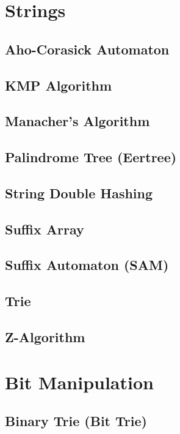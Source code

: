 \section{Strings}
\subsection{Aho-Corasick Automaton}

\subsection{KMP Algorithm}

\subsection{Manacher's Algorithm}

\subsection{Palindrome Tree (Eertree)}

\subsection{String Double Hashing}

\subsection{Suffix Array}

\subsection{Suffix Automaton (SAM)}

\subsection{Trie}

\subsection{Z-Algorithm}

\section{Bit Manipulation}
\subsection{Binary Trie (Bit Trie)}

